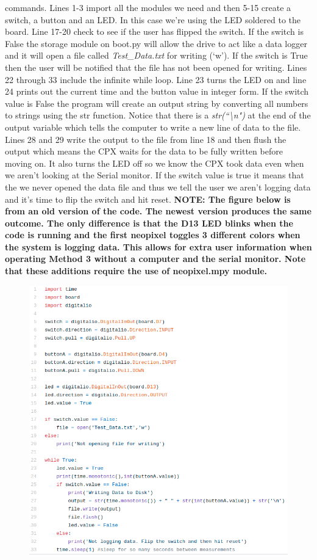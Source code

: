 commands. Lines 1-3 import all the modules we need and then 5-15
create a switch, a button and an LED. In this case we’re using the LED
soldered to the board. Line 17-20 check to see if the user has flipped
the switch. If the switch is False the storage module on boot.py will
allow the drive to act like a data logger and it will open a file
called {\it Test\_Data.txt} for writing (‘w’). If the switch is True then the
user will be notified that the file has not been opened for
writing. Lines 22 through 33 include the infinite while loop. Line 23
turns the LED on and line 24 prints out the current time and the
button value in integer form. If the switch value is False the program
will create an output string by converting all numbers to strings
using the str function. Notice that there is a {\it
  str(``\textbackslash n")} at the end of
the output variable which tells the computer to write a new line of
data to the file. Lines 28 and 29 write the output to the file from
line 18 and then flush the output which means the CPX waits for the
data to be fully written before moving on. It also turns the LED off
so we know the CPX took data even when we aren’t looking at the Serial
monitor. If the switch value is true it means that the we never opened
the data file and thus we tell the user we aren’t logging data and
it’s time to flip the switch and hit reset. {\bf NOTE: The figure below is from an old version of the code. The newest version produces the same outcome. The only difference is that the D13 LED blinks when the code is running and the first neopixel toggles 3 different colors when the system is logging data. This allows for extra user information when operating Method 3 without a computer and the serial monitor. Note that these additions require the use of neopixel.mpy module.} 
\begin{figure}[H]
  \begin{center}
    \includegraphics[width=\textwidth]{Figures/method3_1.png}
  \end{center}
\end{figure}
